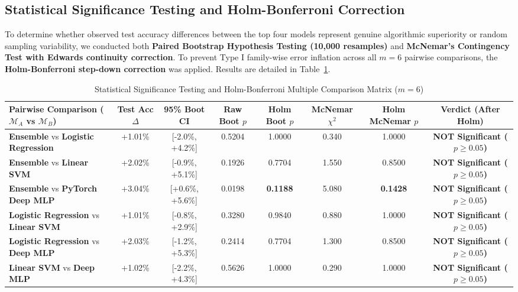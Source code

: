 \documentclass[journal]{IEEEtran}
\begin{document}
\subsection{Statistical Significance Testing and Holm-Bonferroni Correction}
To determine whether observed test accuracy differences between the top four models represent genuine algorithmic superiority or random sampling variability, we conducted both \textbf{Paired Bootstrap Hypothesis Testing (10,000 resamples)} and \textbf{McNemar's Contingency Test with Edwards continuity correction}. To prevent Type I family-wise error inflation across all $m = 6$ pairwise comparisons, the \textbf{Holm-Bonferroni step-down correction} was applied. Results are detailed in Table~\ref{tab:significance}.

\begin{table}[t]
\caption{Statistical Significance Testing and Holm-Bonferroni Multiple Comparison Matrix ($m=6$)}
\label{tab:significance}
\centering
\small
\begin{tabular}{lccccccc}
\toprule
\textbf{Pairwise Comparison ($\mathcal{M}_A$ vs $\mathcal{M}_B$)} & \textbf{Test Acc $\Delta$} & \textbf{95\% Boot CI} & \textbf{Raw Boot $p$} & \textbf{Holm Boot $p$} & \textbf{McNemar $\chi^2$} & \textbf{Holm McNemar $p$} & \textbf{Verdict (After Holm)} \\
\midrule
\textbf{Ensemble} vs \textbf{Logistic Regression} & +1.01\% & [-2.0\%, +4.2\%] & 0.5204 & 1.0000 & 0.340 & 1.0000 & \textbf{NOT Significant ($p \ge 0.05$)} \\
\textbf{Ensemble} vs \textbf{Linear SVM} & +2.02\% & [-0.9\%, +5.1\%] & 0.1926 & 0.7704 & 1.550 & 0.8500 & \textbf{NOT Significant ($p \ge 0.05$)} \\
\textbf{Ensemble} vs \textbf{PyTorch Deep MLP} & +3.04\% & [+0.6\%, +5.6\%] & 0.0198 & \textbf{0.1188} & 5.080 & \textbf{0.1428} & \textbf{NOT Significant ($p \ge 0.05$)} \\
\textbf{Logistic Regression} vs \textbf{Linear SVM} & +1.01\% & [-0.8\%, +2.9\%] & 0.3280 & 0.9840 & 0.880 & 1.0000 & \textbf{NOT Significant ($p \ge 0.05$)} \\
\textbf{Logistic Regression} vs \textbf{Deep MLP} & +2.03\% & [-1.2\%, +5.3\%] & 0.2414 & 0.7704 & 1.300 & 0.8500 & \textbf{NOT Significant ($p \ge 0.05$)} \\
\textbf{Linear SVM} vs \textbf{Deep MLP} & +1.02\% & [-2.2\%, +4.3\%] & 0.5626 & 1.0000 & 0.290 & 1.0000 & \textbf{NOT Significant ($p \ge 0.05$)} \\
\bottomrule
\end{tabular}
\end{table}
\end{document}
